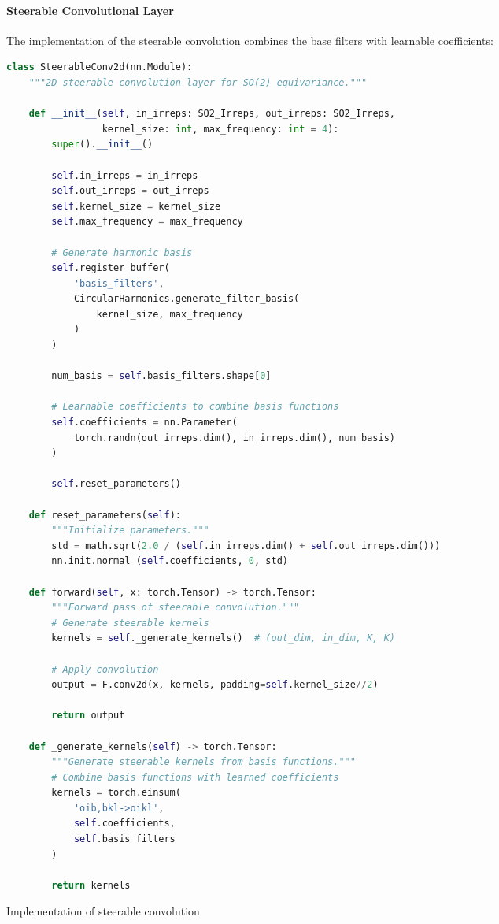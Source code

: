 \paragraph{Steerable Convolutional Layer}

The implementation of the steerable convolution combines the base filters with learnable coefficients:

\begin{listing}[h]
\begin{lstlisting}[language=Python]
class SteerableConv2d(nn.Module):
    """2D steerable convolution layer for SO(2) equivariance."""

    def __init__(self, in_irreps: SO2_Irreps, out_irreps: SO2_Irreps,
                 kernel_size: int, max_frequency: int = 4):
        super().__init__()

        self.in_irreps = in_irreps
        self.out_irreps = out_irreps
        self.kernel_size = kernel_size
        self.max_frequency = max_frequency

        # Generate harmonic basis
        self.register_buffer(
            'basis_filters',
            CircularHarmonics.generate_filter_basis(
                kernel_size, max_frequency
            )
        )

        num_basis = self.basis_filters.shape[0]

        # Learnable coefficients to combine basis functions
        self.coefficients = nn.Parameter(
            torch.randn(out_irreps.dim(), in_irreps.dim(), num_basis)
        )

        self.reset_parameters()

    def reset_parameters(self):
        """Initialize parameters."""
        std = math.sqrt(2.0 / (self.in_irreps.dim() + self.out_irreps.dim()))
        nn.init.normal_(self.coefficients, 0, std)

    def forward(self, x: torch.Tensor) -> torch.Tensor:
        """Forward pass of steerable convolution."""
        # Generate steerable kernels
        kernels = self._generate_kernels()  # (out_dim, in_dim, K, K)

        # Apply convolution
        output = F.conv2d(x, kernels, padding=self.kernel_size//2)

        return output

    def _generate_kernels(self) -> torch.Tensor:
        """Generate steerable kernels from basis functions."""
        # Combine basis functions with learned coefficients
        kernels = torch.einsum(
            'oib,bkl->oikl',
            self.coefficients,
            self.basis_filters
        )

        return kernels
\end{lstlisting}
\caption{Implementation of steerable convolution}
\label{code:steerable_conv}
\end{listing}

